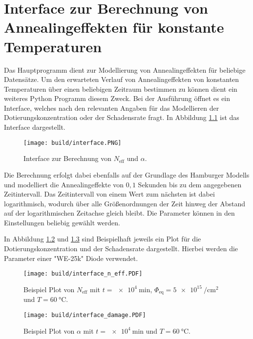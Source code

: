 \chapter{Interface zur Berechnung von Annealingeffekten für konstante Temperaturen}
Das Hauptprogramm dient zur Modellierung von Annealingeffekten für beliebige Datensätze.
Um den erwarteten Verlauf von Annealingeffekten von konstanten Temperaturen über einen
beliebigen Zeitraum bestimmen zu können dient ein weiteres Python Programm diesem Zweck.
Bei der Ausführung öffnet es ein Interface, welches nach den relevanten Angaben für
das Modellieren der Dotierungskonzentration oder der Schadensrate fragt. In Abbildung \ref{fig:interface}
ist das Interface dargestellt.

\begin{figure}
    \texttt{[image: build/interface.PNG]}
\caption{Interface zur Berechnung von $N_{\mathrm{eff}}$ und $\alpha$.}
\label{fig:interface}
\end{figure}

Die Berechnung erfolgt dabei ebenfalls auf der Grundlage des Hamburger Modells und modelliert die
Annealingeffekte von
$0,1$ Sekunden bis zu dem angegebenen Zeitintervall.
Das Zeitintervall von einem Wert zum nächsten ist dabei logarithmisch, wodurch über alle
Größenordnungen der Zeit hinweg der Abstand auf der logarithmischen Zeitachse gleich bleibt.
Die Parameter können in den Einstellungen beliebig gewählt werden.

In Abbildung \ref{fig:inter_n} und \ref{fig:inter_damage} sind Beispielhaft jeweils ein Plot für die Dotierungskonzentration und der
Schadensrate dargestellt. Hierbei werden die Parameter einer "WE-25k" Diode verwendet.


\begin{figure}
  \texttt{[image: build/interface\_n\_eff.PDF]}
  \caption{Beispiel Plot von $N_{\mathrm{eff}}$ mit $t = \SI{e4}{\minute}$, $\Phi_{\mathrm{eq}}= \SI{5e15}{\per\centi\meter\squared}$ und $T=\SI{60}{\celsius}$.}
  \label{fig:inter_n}
\end{figure}

\begin{figure}
  \texttt{[image: build/interface\_damage.PDF]}
  \caption{Beispiel Plot von $\alpha$ mit $t = \SI{e4}{\minute}$ und $T=\SI{60}{\celsius}$.}
  \label{fig:inter_damage}
\end{figure}
